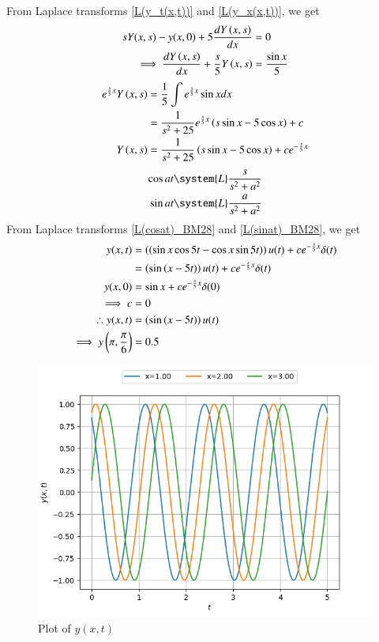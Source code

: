 \documentclass[journal,12pt,twocolumn]{IEEEtran}
\theoremstyle{remark}
\begin{document}
From Laplace transforms \eqref{L(y_t(x,t))} and \eqref{L(y_x(x,t))}, we get
\begin{align}
sY(x,s)-y(x,0) + 5\frac{dY\left(x,s\right)}{dx} &= 0\\
\implies \frac{dY\left(x,s\right)}{dx} + \frac{s}{5}Y\left(x,s\right) &= \frac{\sin{x}}{5}
\end{align}
\begin{align}
e^{\frac{s}{5}x}Y\left(x,s\right) &= \frac{1}{5} \int e^{\frac{s}{5}x}\sin{x}dx \\
&= \frac{1}{s^2+25}e^{\frac{s}{5}x} \left(s\sin{x}-5\cos{x}\right) + c\\
Y\left(x,s\right) &= \frac{1}{s^2+25} \left(s\sin{x}-5\cos{x}\right) + ce^{-\frac{s}{5}x}
\end{align}
\begin{align}
\label{L(cosat)_BM28} \cos{at} &\system{L} \frac{s}{s^2+a^2} \\
\label{L(sinat)_BM28} \sin{at} &\system{L} \frac{a}{s^2+a^2}
\end{align}
From Laplace transforms \eqref{L(cosat)_BM28} and \eqref{L(sinat)_BM28}, we get
\begin{align}
y(x,t) &= \left(\left(\sin{x}\cos{5t}-\cos{x}\sin{5t}\right)\right)u(t)+ce^{-\frac{s}{5}x}\delta(t)\\
&= \left(\sin{\ensuremath{\left(x-5t\right)}}\right)u(t)+ce^{-\frac{s}{5}x}\delta(t)\\
y(x,0) &= \sin{x}+ce^{-\frac{s}{5}x}\delta(0)\\
\implies c &= 0\\
\therefore y(x,t) &= \left(\sin{\ensuremath{\left(x-5t\right)}}\right)u(t)\\
\implies y\left(\pi,\frac{\pi}{6}\right) &= 0.5
\end{align}
\begin{figure}[htbp]
	\includegraphics[width=\columnwidth]{figs/plot.png}
	\caption{Plot of $y(x,t)$}
	\label{fig:plot_bm_28}
\end{figure}
\end{document}
